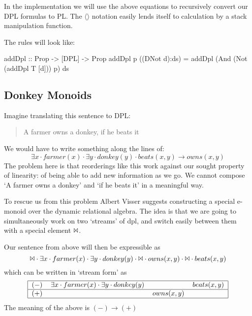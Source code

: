 \documentclass[12pt]{article}
\begin{document}
In the implementation we will use the above equations to recursively convert our DPL formulas to PL. The $\langle\rangle$ notation easily lends itself to calculation by a stack manipulation function.

The rules will look like:
\begin{haskell}
addDpl :: Prop -> [DPL] -> Prop
addDpl p ((DNot d):ds) = addDpl (And (Not (addDpl T [d])) p) ds
\end{haskell}


\subsection{Donkey Monoids}

Imagine translating this sentence to DPL:
%
\begin{quotation}
A farmer owns a donkey, if he beats it
\end{quotation}
%
We would have to write something along the lines of:
%
\begin{equation}
\exists x \cdot farmer(x) \cdot \exists y \cdot donkey(y) \cdot beats(x,y) \rightarrow owns(x,y)
\end{equation}
%
The problem here is that reorderings like this work against our sought property of linearity: of being able to add new information as we go. We cannot compose `A farmer owns a donkey' and `if he beats it' in a meaningful way.

To rescue us from this problem Albert Visser suggests constructing a special e-monoid over the dynamic relational algebra. The idea is that we are going to simultaneously work on two `streams' of dpl, and switch easily between them with a special element $\Bowtie$.

Our sentence from above will then be expressible as
%
\begin{equation}
\Bowtie \cdot \exists x \cdot farmer(x) \cdot \exists y \cdot donkey(y) \cdot \Bowtie \cdot owns(x,y) \cdot \Bowtie \cdot beats(x,y)
\end{equation}
%
which can be written in `stream form' as
%
\begin{equation}
\begin{tabular}{|clll|}
    \hline
    $(-)$ & $\exists x \cdot farmer(x) \cdot \exists y \cdot donkey(y)$ & ~ & $beats(x,y)$ \\\hline
    $(+)$ & ~ & $owns(x,y)$ & ~ \\\hline
\end{tabular}
\end{equation}
%
The meaning of the above is $(-) \rightarrow (+)$
\end{document}
